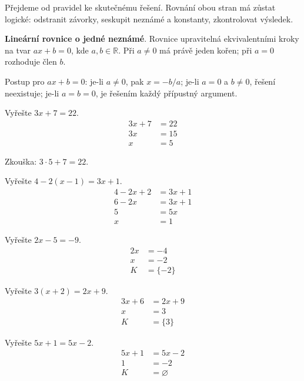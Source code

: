 \documentclass[11pt,a4paper]{article}
\begin{document}
Přejdeme od pravidel ke skutečnému řešení. Rovnání obou stran má zůstat logické: odstranit závorky, seskupit neznámé a konstanty, zkontrolovat výsledek.
\begin{definiceBox}
\textbf{Lineární rovnice o jedné neznámé}. Rovnice upravitelná ekvivalentními kroky na tvar $ax+b=0$, kde $a,b\in\mathbb R$. Při $a\ne0$ má právě jeden kořen; při $a=0$ rozhoduje člen $b$.
\end{definiceBox}
Postup pro $ax+b=0$: je-li $a\ne0$, pak $x=-b/a$; je-li $a=0$ a $b\ne0$, řešení neexistuje; je-li $a=b=0$, je řešením každý přípustný argument.
\begin{prikladReseniBox}[title={Příklad 1}]
Vyřešte $3x+7=22$.
\tcblower
\begin{align*}
3x+7&=22 \\
 3x&=15 \\
 x&=5
\end{align*}

Zkouška: $3\cdot5+7=22$.
\end{prikladReseniBox}
\begin{prikladReseniBox}[title={Příklad 2}]
Vyřešte $4-2(x-1)=3x+1$.
\tcblower
\begin{align*}
4-2x+2&=3x+1 \\
 6-2x&=3x+1 \\
 5&=5x \\
 x&=1
\end{align*}
\end{prikladReseniBox}
\begin{zadaniReseniBox}[title={Úloha 1}]
Vyřešte $2x-5=-9$.
\tcblower
\begin{align*}
2x&=-4 \\
 x&=-2 \\
 K&=\{-2\}
\end{align*}
\end{zadaniReseniBox}
\begin{zadaniReseniBox}[title={Úloha 2}]
Vyřešte $3(x+2)=2x+9$.
\tcblower
\begin{align*}
3x+6&=2x+9 \\
 x&=3 \\
 K&=\{3\}
\end{align*}
\end{zadaniReseniBox}
\begin{zadaniReseniBox}[title={Úloha 3}]
Vyřešte $5x+1=5x-2$.
\tcblower
\begin{align*}
5x+1&=5x-2 \\
 1&=-2 \\
 K&=\varnothing
\end{align*}
\end{zadaniReseniBox}
\end{document}

